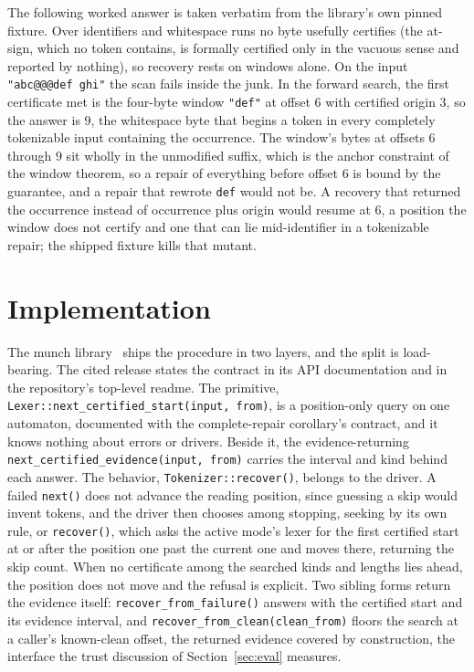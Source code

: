 \documentclass[11pt,a4paper]{article}
\theoremstyle{definition}
\theoremstyle{plain}
\theoremstyle{remark}
\newcommand{\code}[1]{\texttt{#1}}
\begin{document}
The following worked answer is taken verbatim from the library's own pinned fixture. Over identifiers and whitespace
runs no byte usefully certifies (the at-sign, which no token contains, is formally certified only in the vacuous sense
and reported by nothing), so recovery rests on windows alone. On the input \code{"abc@@@def ghi"} the scan fails inside
the junk. In the forward search, the first certificate met is the four-byte window \code{"def\textvisiblespace"} at
offset $6$ with certified origin $3$, so the answer is $9$, the whitespace byte that begins a token in every completely
tokenizable input containing the occurrence. The window's bytes at offsets $6$ through $9$ sit wholly in the unmodified
suffix, which is the anchor constraint of the window theorem, so a repair of everything before offset $6$ is bound by
the guarantee, and a repair that rewrote \code{def} would not be. A recovery that returned the occurrence instead of
occurrence plus origin would resume at $6$, a position the window does not certify and one that can lie mid-identifier
in a tokenizable repair; the shipped fixture kills that mutant.


\section{Implementation}
\label{sec:impl}

The munch library~\citep{munch} ships the procedure in two layers, and the split is load-bearing. The cited release
states the contract in its API documentation and in the repository's top-level readme. The primitive,
\code{Lexer::next\_certified\_start(input, from)}, is a position-only query on one automaton, documented with the
complete-repair corollary's contract, and it knows nothing about errors or drivers. Beside it, the evidence-returning
\code{next\_certified\_evidence(input, from)} carries the interval and kind behind each answer. The behavior,
\code{Tokenizer::recover()}, belongs to the driver. A failed \code{next()} does not advance the reading position, since
guessing a skip would invent tokens, and the driver then chooses among stopping, seeking by its own rule, or
\code{recover()}, which asks the active mode's lexer for the first certified start at or after the position one past the
current one and moves there, returning the skip count. When no certificate among the searched kinds and lengths lies
ahead, the position does not move and the refusal is explicit. Two sibling forms return the evidence itself:
\code{recover\_from\_failure()} answers with the certified start and its evidence interval, and
\code{recover\_from\_clean(clean\_from)} floors the search at a caller's known-clean offset, the returned evidence
covered by construction, the interface the trust discussion of Section~\ref{sec:eval} measures.
\end{document}
